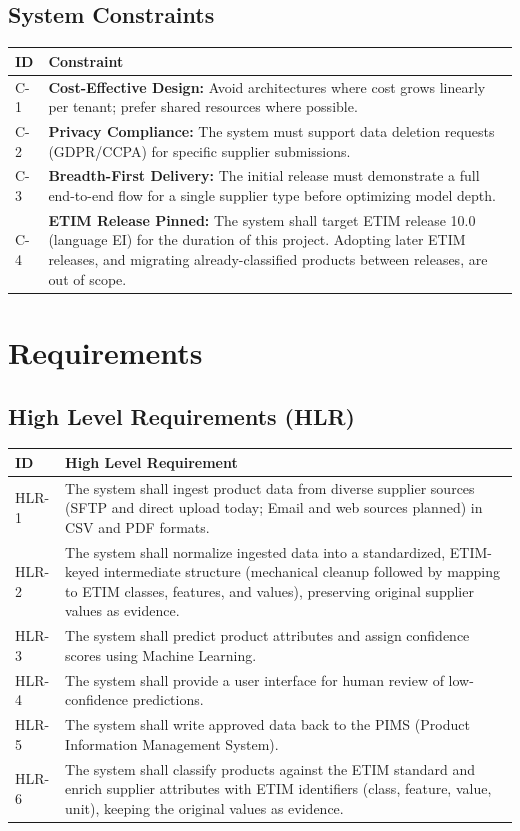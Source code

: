 \documentclass[12pt, a4paper]{article}
\begin{document}
\subsection{System Constraints}
\begin{tabular}{@{}l >{\raggedright\arraybackslash}p{12cm}@{}}
\toprule
\textbf{ID} & \textbf{Constraint} \\
\midrule
C-1 & \textbf{Cost-Effective Design:} Avoid architectures where cost grows linearly per tenant; prefer shared resources where possible. \\
\addlinespace
C-2 & \textbf{Privacy Compliance:} The system must support data deletion requests (GDPR/CCPA) for specific supplier submissions. \\
\addlinespace
C-3 & \textbf{Breadth-First Delivery:} The initial release must demonstrate a full end-to-end flow for a single supplier type before optimizing model depth. \\
\addlinespace
C-4 & \textbf{ETIM Release Pinned:} The system shall target ETIM release 10.0 (language EI) for the duration of this project. Adopting later ETIM releases, and migrating already-classified products between releases, are out of scope. \\
\bottomrule
\end{tabular}

\newpage
\section{Requirements}

\subsection{High Level Requirements (HLR)}
\begin{tabular}{@{}lp{12cm}@{}}
\toprule
\textbf{ID} & \textbf{High Level Requirement} \\
\midrule
HLR-1 & The system shall ingest product data from diverse supplier sources (SFTP and direct upload today; Email and web sources planned) in CSV and PDF formats. \\
\addlinespace
HLR-2 & The system shall normalize ingested data into a standardized, ETIM-keyed intermediate structure (mechanical cleanup followed by mapping to ETIM classes, features, and values), preserving original supplier values as evidence. \\
\addlinespace
HLR-3 & The system shall predict product attributes and assign confidence scores using Machine Learning. \\
\addlinespace
HLR-4 & The system shall provide a user interface for human review of low-confidence predictions. \\
\addlinespace
HLR-5 & The system shall write approved data back to the PIMS (Product Information Management System). \\
\addlinespace
HLR-6 & The system shall classify products against the ETIM standard and enrich supplier attributes with ETIM identifiers (class, feature, value, unit), keeping the original values as evidence. \\
\bottomrule
\end{tabular}
\end{document}

